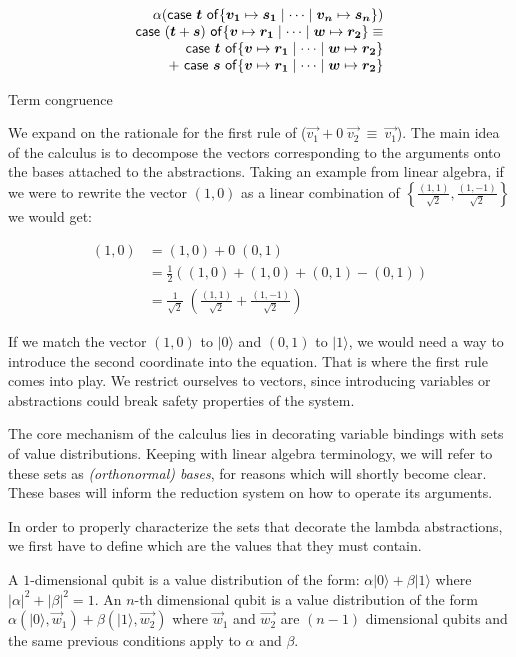 \documentclass[runningheads,orivec]{llncs}
\newcommand\braces[1]{\left\{#1\right\}}
\newcommand\ket[1]{\ensuremath{|#1\rangle}}
\def\Pair#1#2{(#1,#2)} %
\def\gencase#1#2#3#4#5{\ensuremath{\mathsf{case}~#1~\mathsf{of} \{#2\mapsto #4 \mid \dotsb \mid #3\mapsto #5\}}}
\begin{document}
\begin{table*}[tb]
\[\begin{array}{c c}
      \multicolumn{2}{r}{\alpha(\gencase{\vec{t}}{\vec{v_1}}{\vec{v_n}}{\vec{s_1}}{\vec{s_n}})}\\
      \multicolumn{2}{l}{\gencase{(\vec{t}+\vec{s})}{\vec{v}}{\vec{w}}{\vec{r_1}}{\vec{r_2}}\equiv}\\
      \multicolumn{2}{r}{\gencase{\vec{t}}{\vec{v}}{\vec{w}}{\vec{r_1}}{\vec{r_2}}}\\
      \multicolumn{2}{r}{+~\gencase{\vec{s}}{\vec{v}}{\vec{w}}{\vec{r_1}}{\vec{r_2}}}
    \end{array}
  \]
  \caption{Term congruence}
  \label{tab:Congruence}
\end{table*}


We expand on the rationale for the first rule of  ($\vec{v_1} + 0\; \vec{v_2}~\equiv~\vec{v_1}$). The main idea of the calculus is to decompose the vectors corresponding to the arguments onto the bases attached to the abstractions. Taking an example from linear algebra, if we were to rewrite the vector $(1,0)$ as a linear combination of $\braces{\frac{(1,1)}{\sqrt{2}}, \frac{(1,-1)}{\sqrt{2}}}$ we would get:

\begin{align*}
  (1,0) &= (1,0) + 0 \; (0,1) \\
  &=\frac{1}{2} ((1,0) + (1,0) + (0,1) - (0,1))\\
  &=\frac{1}{\sqrt{2}}\;\left(\frac{(1,1)}{\sqrt{2}} + \frac{(1,-1)}{\sqrt{2}}\right)  
\end{align*}

If we match the vector $(1,0)$ to $\ket{0}$ and $(0,1)$ to $\ket{1}$, we would need a way to introduce the second coordinate into the equation. That is where the first rule comes into play. We restrict ourselves to vectors, since introducing variables or abstractions could break safety properties of the system.

The core mechanism of the calculus lies in decorating variable bindings with sets of value distributions. Keeping with linear algebra terminology, we will refer to these sets as \textit{(orthonormal) bases}, for reasons which will shortly become clear. These bases will inform the reduction system on how to operate its arguments. 

In order to properly characterize the sets that decorate the lambda abstractions, we first have to define which are the values that they must contain.
\begin{definition}
  A $1$-dimensional qubit is a value distribution of the form: $\alpha \ket{0} + \beta \ket{1}$ where $|\alpha|^2 + |\beta|^2 = 1$. An $n$-th dimensional qubit is a value distribution of the form $\alpha\Pair{\ket{0}}{\vec w_1} + \beta\Pair{\ket{1}}{\vec{w_2}} $ where $\vec w_1$ and $\vec{w_2}$ are $(n-1)$ dimensional qubits and the same previous conditions apply to $\alpha$ and $\beta$.
\end{definition}
\end{document}
